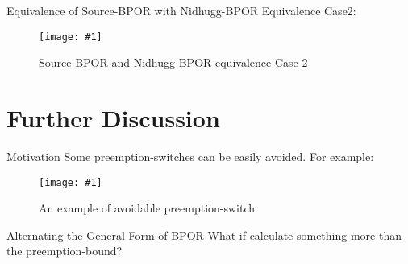 \documentclass[9pt]{beamer}
\newcommand{\trace}[2]{
\begin{figure}[H]
\centering
\texttt{[image: \#1]}
\caption{#2}
\label{#2}
\end{figure}
}
\begin{document}
\begin{frame}{Equivalence of Source-BPOR with Nidhugg-BPOR}
    Equivalence Case2:
   \trace{../img/equivalence_case2.pdf}{Source-BPOR and Nidhugg-BPOR equivalence Case 2}
    
\end{frame}

\section{Further Discussion}

\begin{frame}{Motivation}
Some preemption-switches can be easily avoided. For example:

\trace{../img/motivation.pdf}{An example of avoidable preemption-switch}
    
\end{frame}

\begin{frame}{Alternating the General Form of BPOR}
What if calculate something more than the preemption-bound?
    
\begin{figure}
    
\end{figure}
    
\end{frame}
\end{document}
